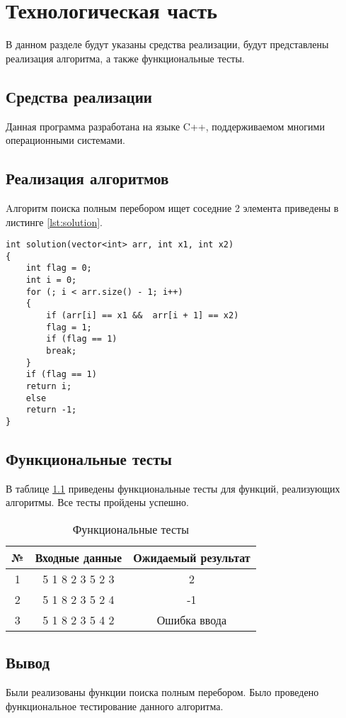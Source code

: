 \chapter{Технологическая часть}

В данном разделе будут указаны средства реализации, будут представлены реализация алгоритма, а также функциональные тесты.



\section{Средства реализации}

Данная программа разработана на языке C++, поддерживаемом многими операционными системами.



\section{Реализация алгоритмов}

Aлгоритм поиска полным перебором ищет соседние 2 элемента приведены в листинге \ref{lst:solution}.


\begin{center}
\captionsetup{justification=raggedright,singlelinecheck=off}
\begin{lstlisting}[label=lst:solution,caption=Aлгоритм поиска полным перебором]
int solution(vector<int> arr, int x1, int x2)
{
	int flag = 0;
	int i = 0;
	for (; i < arr.size() - 1; i++)
	{
		if (arr[i] == x1 &&  arr[i + 1] == x2)
		flag = 1;
		if (flag == 1)
		break;
	}
	if (flag == 1)
	return i;
	else 
	return -1;
}

\end{lstlisting}
\end{center}
\clearpage


\section{Функциональные тесты}

В таблице \ref{tbl:tests} приведены функциональные тесты для функций, реализующих алгоритмы. Все тесты пройдены успешно.

\begin{table}[h]
	\begin{center}
		\begin{threeparttable}
			\captionsetup{justification=raggedright,singlelinecheck=off}
			\caption{\label{tbl:tests} Функциональные тесты}
			\begin{tabular}{|c|c|c|}
				\hline
				№&Входные данные& Ожидаемый результат \\
				\hline
				1&5 1 8 2 3 5 2 3& 2\\
				\hline
				2&5 1 8 2 3 5 2 4& -1\\
				\hline
				3&5 1 8 2 3 5 4 2& Ошибка ввода\\
				\hline
			\end{tabular}
		\end{threeparttable}
	\end{center}
\end{table}


\section{Вывод}

Были реализованы функции поиска полным перебором.
Было проведено функциональное тестирование данного алгоритма.